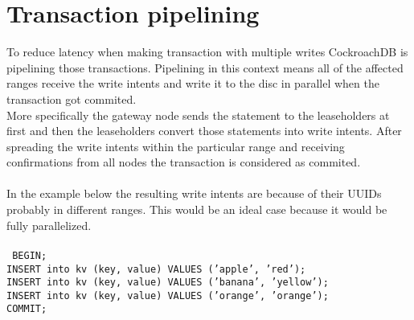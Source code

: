 \documentclass[12pt,a4paper]{article}
\newcommand{\code}[1]{\texttt{#1}}
\begin{document}
\section{Transaction pipelining}
To reduce latency when making transaction with multiple writes CockroachDB is pipelining those transactions. Pipelining in this
context means all of the affected ranges receive the write intents and write it to the disc in parallel when the transaction got
commited. \\More specifically the gateway node sends the statement to the leaseholders at first and then the leaseholders convert
those statements into write intents. After spreading the write intents within the particular range and receiving confirmations
from all nodes the transaction is considered as commited.\\\\
In the example below the resulting write intents are because of their UUIDs probably in different ranges. This would be an ideal
case because it would be fully parallelized.\\\\
\code{
        BEGIN;\\
        INSERT into kv (key, value) VALUES ('apple', 'red');\\
        INSERT into kv (key, value) VALUES ('banana', 'yellow');\\
        INSERT into kv (key, value) VALUES ('orange', 'orange');\\
        COMMIT;\\
}
\end{document}

